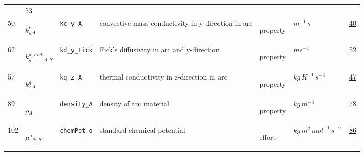 \begin{longtable}{|p{1cm}|p{2.5cm}|p{4.5cm}|p{8cm}|p{3.0cm}|p{3cm}|p{1cm}|}
             &                 \hyperlink{"e:53"}{ 53 }
                 \\
            50
             & \hypertarget{"v:50"}{ $ {{k^c_y}}{_{A}} $}
             & \verb|kc_y_A|
             &  convective mass conductivity in y-direction in arc
             & \begin{lay}property \end{lay}
             & $ m^{-1} \,s \, $
             &                 \hyperlink{"e:40"}{ 40 }
                 \\
            62
             & \hypertarget{"v:62"}{ $ {{k^{d,Fick}_y}}{_{A, S}} $}
             & \verb|kd_y_Fick|
             & Fick's diffusivity in arc and y-direction 
             & \begin{lay}property \end{lay}
             & $ m s^{-1} \, $
             &                 \hyperlink{"e:52"}{ 52 }
                 \\
            57
             & \hypertarget{"v:57"}{ $ {{k^q_z}}{_{A}} $}
             & \verb|kq_z_A|
             & thermal conductivity in z-direction in arc
             & \begin{lay}property \end{lay}
             & $ kg \,K^{-1} \,s^{-3} \, $
             &                 \hyperlink{"e:47"}{ 47 }
                 \\
            89
             & \hypertarget{"v:89"}{ $ {\rho}{_{A}} $}
             & \verb|density_A|
             & density of arc material
             & \begin{lay}property \end{lay}
             & $ kg \,m^{-3} \, $
             &                 \hyperlink{"e:78"}{ 78 }
                 \\
            102
             & \hypertarget{"v:102"}{ $ {{\mu^o}}{_{N, S}} $}
             & \verb|chemPot_o|
             & standard chemical potential
             & \begin{lay}effort \end{lay}
             & $ kg \,m^{2} \,mol^{-1} \,s^{-2} \, $
             &                 \hyperlink{"e:86"}{ 86 }
                 \\
    \end{longtable}
